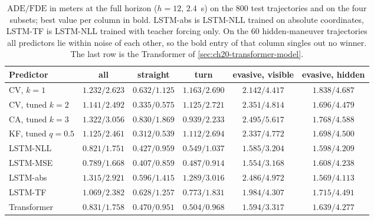 \begin{table}[tb]
  \centering\small
  \caption{$\mathrm{ADE}/\mathrm{FDE}$ in meters at the full horizon ($h = 12$,
  $2.4$~s) on the $800$ test trajectories and on the four subsets; best value
  per column in bold. LSTM-abs is LSTM-NLL trained on absolute coordinates,
  LSTM-TF is LSTM-NLL trained with teacher forcing only. On the $60$
  hidden-maneuver trajectories all predictors lie within noise of each
  other, so the bold entry of that column singles out no winner. The last row
  is the Transformer of \cref{sec:ch20-transformer-model}.}
  \label{tab:ch20-results}
  \setlength{\tabcolsep}{4pt}\footnotesize
  \begin{tabular}{@{}lccccc@{}}
  \toprule
  Predictor & all & straight & turn & evasive, visible & evasive, hidden\\
  \midrule
  CV, $k = 1$ & $1.232/2.623$ & $0.632/1.125$ & $1.163/2.690$ & $2.142/4.417$ & $1.838/4.687$\\
  CV, tuned $k = 2$ & $1.141/2.492$ & $0.335/0.575$ & $1.125/2.721$ & $2.351/4.814$ & $1.696/4.479$\\
  CA, tuned $k = 3$ & $1.322/3.056$ & $0.830/1.869$ & $0.939/2.233$ & $2.495/5.617$ & $1.768/4.588$\\
  KF, tuned $q = 0.5$ & $1.125/2.461$ & $\mathbf{0.312}/\mathbf{0.539}$ & $1.112/2.694$ & $2.337/4.772$ & $1.698/4.500$\\
  LSTM-NLL & $0.821/1.751$ & $0.427/0.959$ & $0.549/1.037$ & $1.585/3.204$ & $1.598/4.209$\\
  LSTM-MSE & $\mathbf{0.789}/\mathbf{1.668}$ & $0.407/0.859$ & $\mathbf{0.487}/\mathbf{0.914}$ & $\mathbf{1.554}/\mathbf{3.168}$ & $1.608/4.238$\\
  LSTM-abs & $1.315/2.921$ & $0.596/1.415$ & $1.289/3.016$ & $2.486/4.972$ & $\mathbf{1.569}/\mathbf{4.113}$\\
  LSTM-TF & $1.069/2.382$ & $0.628/1.257$ & $0.773/1.831$ & $1.984/4.307$ & $1.715/4.491$\\
  \midrule
  Transformer & $0.831/1.758$ & $0.470/0.951$ & $0.504/0.968$ & $1.594/3.317$ & $1.639/4.277$\\
  \bottomrule
  \end{tabular}
\end{table}


